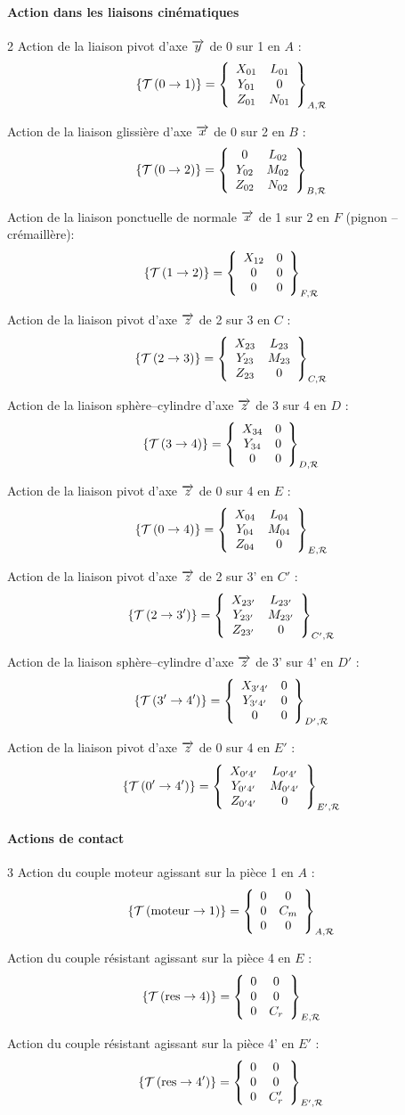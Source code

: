 \documentclass[11pt,oneside]{article}
\begin{document}
\newpage 

\paragraph*{Action dans les liaisons cinématiques}

\begin{multicols}{2}
Action de la liaison pivot d'axe $\vect{y}$ de 0 sur 1 en $A$ :
$$
\torseurstat{T}{0}{1} =
\torseurcol{X_{01}}{Y_{01}}{Z_{01}}{L_{01}}{0}{N_{01}}{A,\mathcal{R}}
$$

Action de la liaison glissière d'axe $\vect{x}$ de 0 sur 2 en $B$ :
$$
\torseurstat{T}{0}{2} =
\torseurcol{0}{Y_{02}}{Z_{02}}{L_{02}}{M_{02}}{N_{02}}{B,\mathcal{R}}
$$

Action de la liaison ponctuelle de normale $\vect{x}$ de 1 sur 2 en $F$ (pignon -- crémaillère):
$$
\torseurstat{T}{1}{2} =
\torseurcol{X_{12}}{0}{0}{0}{0}{0}{F,\mathcal{R}}
$$


Action de la liaison pivot d'axe $\vect{z}$ de 2 sur 3 en $C$ :
$$
\torseurstat{T}{2}{3} =
\torseurcol{X_{23}}{Y_{23}}{Z_{23}}{L_{23}}{M_{23}}{0}{C,\mathcal{R}}
$$

Action de la liaison sphère--cylindre d'axe $\vect{z}$ de 3 sur 4 en $D$ :
$$
\torseurstat{T}{3}{4} =
\torseurcol{X_{34}}{Y_{34}}{0}{0}{0}{0}{D,\mathcal{R}}
$$

Action de la liaison pivot d'axe $\vect{z}$ de 0 sur 4 en $E$ :
$$
\torseurstat{T}{0}{4} =
\torseurcol{X_{04}}{Y_{04}}{Z_{04}}{L_{04}}{M_{04}}{0}{E,\mathcal{R}}
$$



Action de la liaison pivot d'axe $\vect{z}$ de 2 sur 3' en $C'$ :
$$
\torseurstat{T}{2}{3'} =
\torseurcol{X_{23'}}{Y_{23'}}{Z_{23'}}{L_{23'}}{M_{23'}}{0}{C',\mathcal{R}}
$$

Action de la liaison sphère--cylindre d'axe $\vect{z}$ de 3' sur 4' en $D'$ :
$$
\torseurstat{T}{3'}{4'} =
\torseurcol{X_{3'4'}}{Y_{3'4'}}{0}{0}{0}{0}{D',\mathcal{R}}
$$



Action de la liaison pivot d'axe $\vect{z}$ de 0 sur 4 en $E'$ :
$$
\torseurstat{T}{0'}{4'} =
\torseurcol{X_{0'4'}}{Y_{0'4'}}{Z_{0'4'}}{L_{0'4'}}{M_{0'4'}}{0}{E',\mathcal{R}}
$$

\end{multicols}

\paragraph*{Actions de contact}
\begin{multicols}{3}
Action du couple moteur agissant sur la pièce 1 en $A$ :
$$
\torseurstat{T}{\text{moteur}}{1}=
\torseurcol{0}{0}{0}{0}{C_m}{0}{A,\mathcal{R}}
$$


Action du couple résistant agissant sur la pièce 4 en $E$ :
$$
\torseurstat{T}{\text{res}}{4}=
\torseurcol{0}{0}{0}{0}{0}{C_r}{E,\mathcal{R}}
$$

Action du couple résistant agissant sur la pièce 4' en $E'$ :
$$
\torseurstat{T}{\text{res}}{4'}=
\torseurcol{0}{0}{0}{0}{0}{C_r'}{E',\mathcal{R}}
$$
\end{multicols}
\end{document}
